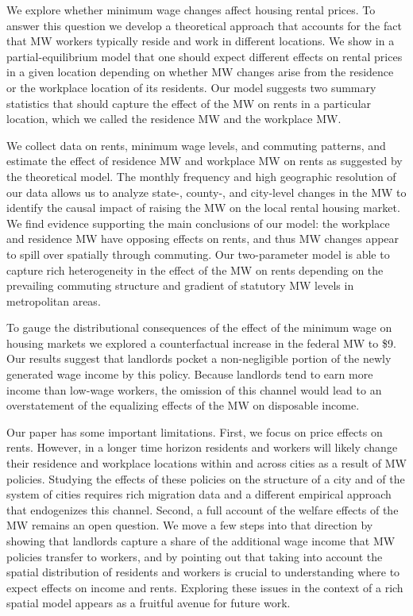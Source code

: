 
We explore whether minimum wage changes affect housing rental prices.
To answer this question we develop a theoretical approach that accounts for
the fact that MW workers typically reside and work in different locations.
We show in a partial-equilibrium model that one should expect different effects
on rental prices in a given location depending on whether MW changes arise from 
the residence or the workplace location of its residents.
Our model suggests two summary statistics that should capture the effect of 
the MW on rents in a particular location, which we called the residence MW and 
the workplace MW.

We collect data on rents, minimum wage levels, and commuting patterns, and
estimate the effect of residence MW and workplace MW on rents as suggested by
the theoretical model.
The monthly frequency and high geographic resolution of our data allows us to 
analyze state-, county-, and city-level changes in the MW to identify the causal 
impact of raising the MW on the local rental housing market.
We find evidence supporting the main conclusions of our model: the workplace and 
residence MW have opposing effects on rents, and thus MW changes appear to 
spill over spatially through commuting.
Our two-parameter model is able to capture rich heterogeneity in the effect 
of the MW on rents depending on the prevailing commuting structure and 
gradient of statutory MW levels in metropolitan areas.

To gauge the distributional consequences of the effect of the minimum wage 
on housing markets we explored a counterfactual increase in the federal MW
to \$9.
Our results suggest that landlords pocket a non-negligible portion of the newly 
generated wage income by this policy.
Because landlords tend to earn more income than low-wage workers,
the omission of this channel would lead to an overstatement of the equalizing 
effects of the MW on disposable income.

Our paper has some important limitations.
First, we focus on price effects on rents.
However, in a longer time horizon residents and workers will likely change 
their residence and workplace locations within and across cities as a result 
of MW policies.
Studying the effects of these policies on the structure of a city and of the 
system of cities requires rich migration data and a different empirical approach
that endogenizes this channel.
Second, a full account of the welfare effects of the MW remains an open question.
We move a few steps into that direction by showing that landlords capture a 
share of the additional wage income that MW policies transfer to workers, and 
by pointing out that taking into account the spatial distribution of residents 
and workers is crucial to understanding where to expect effects on income and 
rents.
Exploring these issues in the context of a rich spatial model 
appears as a fruitful avenue for future work.

